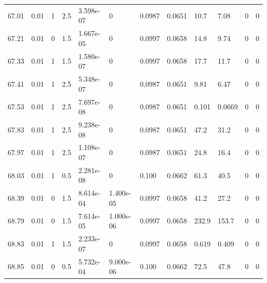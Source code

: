 \documentclass[preview]{standalone}
\begin{document}
{{{{{{{{{{{{{{{\begin{tabular}{L{1.2cm}C{1.2cm} C{0.3cm}C{0.5cm} C{1.4cm}C{1.4cm} C{1.4cm}C{1.4cm} C{1.6cm}C{1.6cm} C{1.6cm}C{1.6cm}}
  67.01  &  0.01  & 1     & 2.5 &  3.598e-07  & 0  &  0.0987&   0.0651& 10.7 & 7.08   &  0 & 0  \\ 
  67.21  &  0.01  & 0     & 1.5 &  1.667e-05  & 0  &  0.0997&   0.0658& 14.8 & 9.74   &  0 & 0  \\ 
  67.33  &  0.01  & 1     & 1.5 &  1.580e-07  & 0  &  0.0997&   0.0658& 17.7 & 11.7   &  0 & 0  \\ 
  67.41  &  0.01  & 1     & 2.5 &  5.348e-07  & 0  &  0.0987&   0.0651& 9.81 & 6.47   &  0 & 0  \\ 
  67.53  &  0.01  & 1     & 2.5 &  7.697e-08  & 0  &  0.0987&   0.0651& 0.101 & 0.0669   &  0 & 0  \\ 
  67.83  &  0.01  & 1     & 2.5 &  9.238e-08  & 0  &  0.0987&   0.0651& 47.2 & 31.2   &  0 & 0  \\ 
  67.97  &  0.01  & 1     & 2.5 &  1.108e-07  & 0  &  0.0987&   0.0651& 24.8 & 16.4   &  0 & 0  \\ 
  68.03  &  0.01  & 1     & 0.5 &  2.281e-08  & 0  &  0.100&   0.0662& 61.3 & 40.5   &  0 & 0  \\ 
  68.39  &  0.01  & 0     & 1.5 &  8.614e-04  & 1.400e-05  &  0.0997&   0.0658& 41.2 & 27.2   &  0 & 0  \\ 
  68.79  &  0.01  & 0     & 1.5 &  7.614e-05  & 1.000e-06  &  0.0997&   0.0658& 232.9 & 153.7   &  0 & 0  \\ 
  68.83  &  0.01  & 1     & 1.5 &  2.233e-07  & 0  &  0.0997&   0.0658& 0.619 & 0.409   &  0 & 0  \\ 
  68.85  &  0.01  & 0     & 0.5 &  5.732e-04  & 9.000e-06  &  0.100&   0.0662& 72.5 & 47.8   &  0 & 0  \\ 
\hline 
\end{tabular} 

}}}}}}}}}}}}}}}
\end{document}
